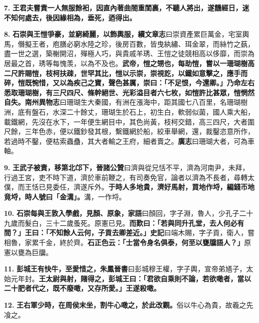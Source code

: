 \textbf{7.} \textbf{王君夫嘗責一人無服餘衵，因直內著曲閤重閨裏，不聽人將出，遂饑經日，迷不知何處去，後因緣相為，垂死，迺得出。}

\textbf{8.} \textbf{石崇與王愷爭豪，並窮綺麗，以飾輿服，}{\footnotesize \textbf{續文章志}曰崇資產累巨萬金，宅室輿馬，僭擬王者，庖膳必窮水陸之珍，後房百數，皆曳紈繡、珥金翠，而絲竹之蓺，盡一世之選，築榭開沼，殫極人巧，與貴戚羊琇、王愷之徒競相高以侈靡，而崇為居最之首，琇等每愧羡，以為不及也。}\textbf{武帝，愷之甥也，每助愷，嘗以一珊瑚樹高二尺許賜愷，枝柯扶疎，世罕其比，愷以示崇，崇視訖，以鐵如意擊之，應手而碎，愷既惋惜，又以為疾己之寶，聲色甚厲，崇曰：「不足恨，今還卿。」乃命左右悉取珊瑚樹，有三尺四尺、條幹絕世、光彩溢目者六七枚，如愷許比甚眾，愷惘然自失。}{\footnotesize \textbf{南州異物志}曰珊瑚生大秦國，有洲在漲海中，距其國七八百里，名珊瑚樹洲，底有盤石，水深二十餘丈，珊瑚生於石上，初生白，軟弱似菌，國人乘大船，載鐵網，先沒在水下，一年便生網目中，其色尚黃，枝柯交錯，高三四尺，大者圍尺餘，三年色赤，便以鐵鈔發其根，繫鐵網於船，絞車舉網，還，裁鑿恣意所作，若過時不鑿，便枯索蟲蠱，其大者輸之王府，細者賣之。\textbf{廣志}曰珊瑚大者，可為車軸。}

\textbf{9.} \textbf{王武子被責，移第北邙下，}{\footnotesize \textbf{晉諸公贊}曰濟與從兄恬不平，濟為河南尹，未拜，行過王宮，吏不時下道，濟於車前鞭之，有司奏免官，論者以濟為不長者，尋轉太僕，而王恬已見委任，濟遂斥外。}\textbf{于時人多地貴，濟好馬射，買地作埒，編錢帀地竟埒，時人號曰「金溝」。}{\footnotesize 溝，一作埒。}

\textbf{10.} \textbf{石崇每與王敦入學戲，見顏、原象，}{\footnotesize \textbf{家語}曰顏回，字子淵，魯人，少孔子二十九歲而髮白，三十二歲蚤死。原憲已見。}\textbf{而歎曰：「若與同升孔堂，去人何必有間？」王曰：「不知餘人云何，子貢去卿差近。」}{\footnotesize \textbf{史記}曰端木賜，字子貢，衛人，嘗相魯，家累千金，終於齊。}\textbf{石正色云：「士當令身名俱泰，何至以甕牖語人？」}{\footnotesize 原憲以甕為巨牖。}

\textbf{11.} \textbf{彭城王有快牛，至愛惜之，}{\footnotesize \textbf{朱鳳晉書}曰彭城穆王權，字子輿，宣帝弟馗子，太始元年封。}\textbf{王太尉與射，賭得之，彭城王曰：「君欲自乘則不論，若欲噉者，當以二十肥者代之，既不廢噉，又存所愛。」王遂殺噉。}

\textbf{12.} \textbf{王右軍少時，在周侯末坐，割牛心噉之，於此改觀。}{\footnotesize 俗以牛心為貴，故羲之先飡之。}
